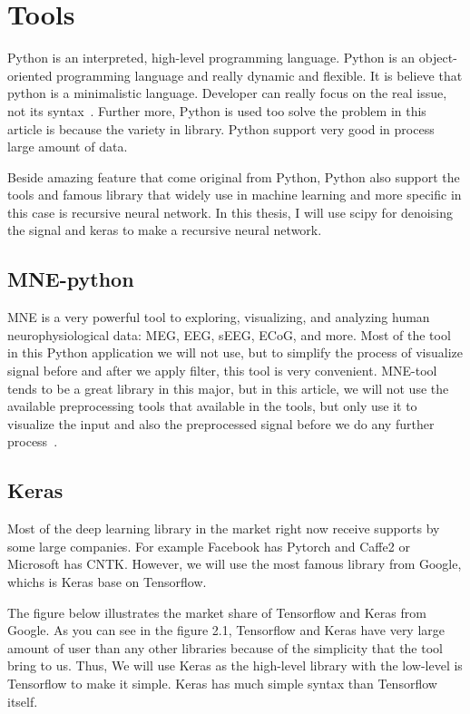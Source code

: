 \section{Tools}
    Python is an interpreted, high-level programming language. Python is an object-oriented programming language and really dynamic and flexible. It is believe that python is a minimalistic language. Developer can really focus on the real issue, not its syntax~\cite{GGGG}. Further more, Python is used too solve the problem in this article is because the variety in library. Python support very good in process large amount of data.
    
    Beside amazing feature that come original from Python, Python also support the tools and famous library that widely use in machine learning and more specific in this case is recursive neural network. In this thesis, I will use scipy for denoising the signal and keras to make a recursive neural network.

    \subsection{MNE-python}
    MNE is a very powerful tool to exploring, visualizing, and analyzing human neurophysiological data: MEG, EEG, sEEG, ECoG, and more. Most of the tool in this Python application we will not use, but to simplify the process of visualize signal before and after we apply filter, this tool is very convenient. MNE-tool tends to be a great library in this major, but in this article, we will not use the available preprocessing tools that available in the tools, but only use it to visualize the input and also the preprocessed signal before we do any further process~\cite{MNE}.
    
    \subsection{Keras}
    Most of the deep learning library in the market right now receive supports by some large companies. For example Facebook has Pytorch and Caffe2 or Microsoft has CNTK. However, we will use the most famous library from Google, whichs is Keras base on Tensorflow.
    
    The figure below illustrates the market share of Tensorflow and Keras from Google\cite{marketshare}. As you can see in the figure 2.1, Tensorflow and Keras have very large amount of user than any other libraries because of the simplicity that the tool bring to us. Thus, We will use Keras as the high-level library with the low-level is Tensorflow to make it simple. Keras has much simple syntax than Tensorflow itself.
    
